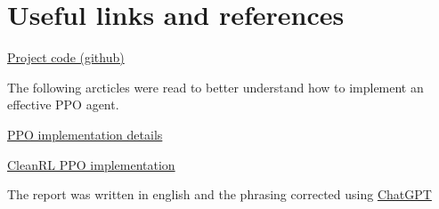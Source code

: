 \documentclass{article}
\begin{document}
\section{Useful links and references}
\href{https://github.com/ancaah/autonomous}{Project code (github)}

The following arcticles were read to better understand how to implement an effective PPO agent.

\href{https://iclr-blog-track.github.io/2022/03/25/ppo-implementation-details/}{PPO implementation details}

\href{https://github.com/vwxyzjn/cleanrl/blob/master/cleanrl/ppo.py}{CleanRL PPO implementation}

The report was written in english and the phrasing corrected using \href{https://chat.openai.com}{ChatGPT}


\end{document}
